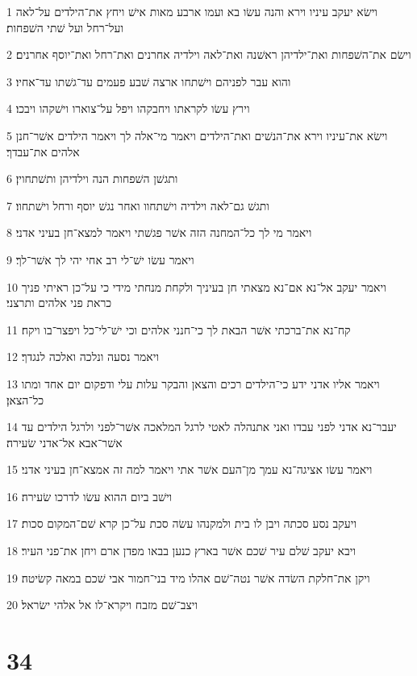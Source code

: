 \par 1 וישׂא יעקב עיניו וירא והנה עשׂו בא ועמו ארבע מאות אישׁ ויחץ את־הילדים על־לאה ועל־רחל ועל שׁתי השׁפחות׃
\par 2 וישׂם את־השׁפחות ואת־ילדיהן ראשׁנה ואת־לאה וילדיה אחרנים ואת־רחל ואת־יוסף אחרנים׃
\par 3 והוא עבר לפניהם וישׁתחו ארצה שׁבע פעמים עד־גשׁתו עד־אחיו׃
\par 4 וירץ עשׂו לקראתו ויחבקהו ויפל על־צוארו וישׁקהו ויבכו׃
\par 5 וישׂא את־עיניו וירא את־הנשׁים ואת־הילדים ויאמר מי־אלה לך ויאמר הילדים אשׁר־חנן אלהים את־עבדך׃
\par 6 ותגשׁן השׁפחות הנה וילדיהן ותשׁתחוין׃
\par 7 ותגשׁ גם־לאה וילדיה וישׁתחוו ואחר נגשׁ יוסף ורחל וישׁתחוו׃
\par 8 ויאמר מי לך כל־המחנה הזה אשׁר פגשׁתי ויאמר למצא־חן בעיני אדני׃
\par 9 ויאמר עשׂו ישׁ־לי רב אחי יהי לך אשׁר־לך׃
\par 10 ויאמר יעקב אל־נא אם־נא מצאתי חן בעיניך ולקחת מנחתי מידי כי על־כן ראיתי פניך כראת פני אלהים ותרצני׃
\par 11 קח־נא את־ברכתי אשׁר הבאת לך כי־חנני אלהים וכי ישׁ־לי־כל ויפצר־בו ויקח׃
\par 12 ויאמר נסעה ונלכה ואלכה לנגדך׃
\par 13 ויאמר אליו אדני ידע כי־הילדים רכים והצאן והבקר עלות עלי ודפקום יום אחד ומתו כל־הצאן׃
\par 14 יעבר־נא אדני לפני עבדו ואני אתנהלה לאטי לרגל המלאכה אשׁר־לפני ולרגל הילדים עד אשׁר־אבא אל־אדני שׂעירה׃
\par 15 ויאמר עשׂו אציגה־נא עמך מן־העם אשׁר אתי ויאמר למה זה אמצא־חן בעיני אדני׃
\par 16 וישׁב ביום ההוא עשׂו לדרכו שׂעירה׃
\par 17 ויעקב נסע סכתה ויבן לו בית ולמקנהו עשׂה סכת על־כן קרא שׁם־המקום סכות׃
\par 18 ויבא יעקב שׁלם עיר שׁכם אשׁר בארץ כנען בבאו מפדן ארם ויחן את־פני העיר׃
\par 19 ויקן את־חלקת השׂדה אשׁר נטה־שׁם אהלו מיד בני־חמור אבי שׁכם במאה קשׂיטה׃
\par 20 ויצב־שׁם מזבח ויקרא־לו אל אלהי ישׂראל׃

\chapter{34}

